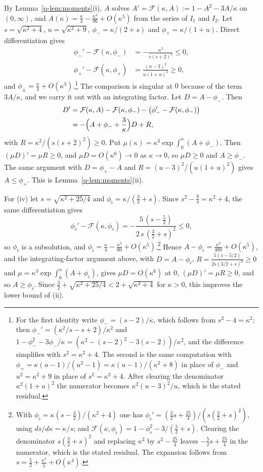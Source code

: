 \documentclass[11pt]{amsart}
\theoremstyle{definition}
\theoremstyle{remark}
\numberwithin{equation}{section}
\begin{document}
By Lemma~\ref{q-lem:moments}(i), $A$ solves $A'=\mathcal F(\kappa,A):=1-A^2-
3A/\kappa$ on $(0,\infty)$, and $A(\kappa)=\frac\kappa4-\frac{\kappa^3}{96}+
O(\kappa^5)$ from the series of $I_1$ and $I_2$. Let $s=\sqrt{\kappa^2+4}$,
$u=\sqrt{\kappa^2+9}$, $\phi_-=\kappa/(2+s)$ and $\phi_+=\kappa/(1+u)$. Direct
differentiation gives
\[
\begin{aligned}
\phi_-'-\mathcal F(\kappa,\phi_-)&=-\frac{\kappa^2}{s(s+2)^2}\le0,\\
\phi_+'-\mathcal F(\kappa,\phi_+)&=\frac{(u-3)^2}{u(1+u)^2}\ge0,
\end{aligned}
\]
and $\phi_\pm=\frac\kappa4+O(\kappa^3)$.\footnote{For the first identity write
$\phi_-=(s-2)/\kappa$, which follows from $s^2-4=\kappa^2$; then
$\phi_-'=(\kappa^2/s-s+2)/\kappa^2$ and $1-\phi_-^2-3\phi_-/\kappa=
(\kappa^2-(s-2)^2-3(s-2))/\kappa^2$, and the difference simplifies with
$s^2=\kappa^2+4$. The second is the same computation with
$\phi_+=\kappa(u-1)/(u^2-1)=\kappa(u-1)/(\kappa^2+8)$ in place of $\phi_-$
and $u^2=\kappa^2+9$ in place of $s^2=\kappa^2+4$. After clearing the denominator $\kappa^2(1+u)^2$ the
numerator becomes $\kappa^2(u-3)^2/u$, which is the stated residual.} The comparison is singular at $0$
because of the term $3A/\kappa$, and we carry it out with an integrating
factor. Let $D=A-\phi_-$. Then
\[
\begin{aligned}
D'&=\mathcal F(\kappa,A)-\mathcal F(\kappa,\phi_-)-\bigl(\phi_-'-\mathcal F(
\kappa,\phi_-)\bigr)\\
&=-\Bigl(A+\phi_-+\frac3\kappa\Bigr)D+R,
\end{aligned}
\]
with $R=\kappa^2/(s(s+2)^2)\ge0$. Put $\mu(\kappa)=\kappa^3\exp\int_0^\kappa
(A+\phi_-)$. Then $(\mu D)'=\mu R\ge0$, and $\mu D=O(\kappa^6)\to0$ as
$\kappa\to0$, so $\mu D\ge0$ and $A\ge\phi_-$. The same argument with
$D=\phi_+-A$ and $R=(u-3)^2/(u(1+u)^2)$ gives $A\le\phi_+$. This is
Lemma~\ref{q-lem:moments}(ii).

For (iv) let $s=\sqrt{\kappa^2+25/4}$ and $\phi_\flat=\kappa/(\frac32+s)$.
Since $s^2-\frac94=\kappa^2+4$, the same differentiation gives
\[
\phi_\flat'-\mathcal F(\kappa,\phi_\flat)=-\frac{5\,(s-\frac52)}{2\,s\,
(\frac32+s)^2}\le0,
\]
so $\phi_\flat$ is a subsolution, and $\phi_\flat=\frac\kappa4-\frac{\kappa^3}
{80}+O(\kappa^5)$.\footnote{With $\phi_\flat=\kappa(s-\frac32)/(\kappa^2+4)$ one
has $\phi_\flat'=(\frac32 s+\frac{25}4)/(s(\frac32+s)^2)$, using $ds/d\kappa=
\kappa/s$; and $\mathcal F(\kappa,\phi_\flat)=1-\phi_\flat^2-3/(\frac32+s)$.
Clearing the denominator $s(\frac32+s)^2$ and replacing $\kappa^2$ by
$s^2-\frac{25}4$ leaves $-\frac52 s+\frac{25}4$ in the numerator, which is the
stated residual. The expansion follows from $s=\frac52+\frac{\kappa^2}5+
O(\kappa^4)$.} Hence $A-\phi_\flat=\frac{\kappa^3}{480}+O(\kappa^5)$, and the
integrating-factor argument above, with $D=A-\phi_\flat$, $R=\frac{5(s-5/2)}
{2s(3/2+s)^2}\ge0$ and $\mu=\kappa^3\exp\int_0^\kappa(A+\phi_\flat)$, gives
$\mu D=O(\kappa^6)$ at $0$, $(\mu D)'=\mu R\ge0$, and so $A\ge\phi_\flat$. Since
$\frac32+\sqrt{\kappa^2+25/4}<2+\sqrt{\kappa^2+4}$ for $\kappa>0$, this
improves the lower bound of (ii).
\end{document}
